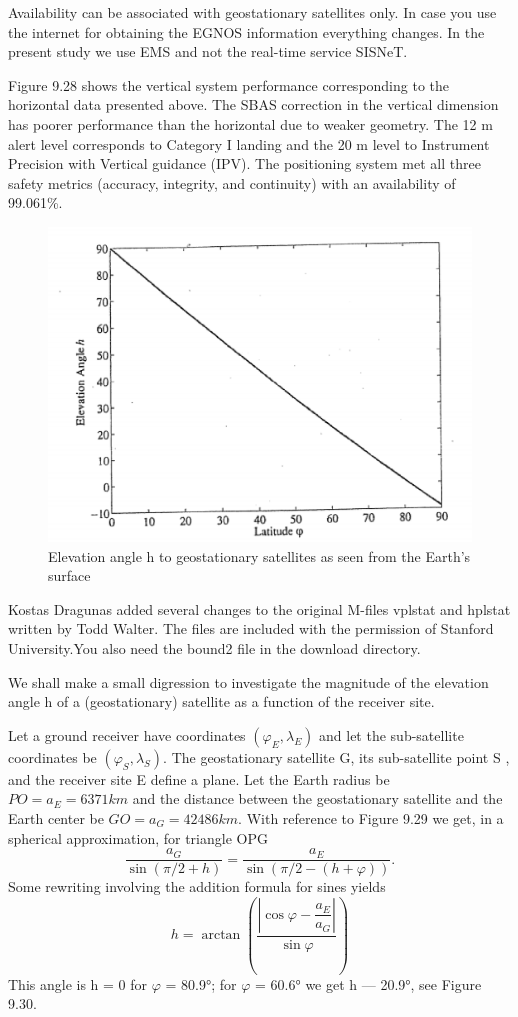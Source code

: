 		Availability can be associated with geostationary satellites only. In case you use the internet for obtaining the EGNOS information everything changes. In the present study we use EMS and not the real-time service SISNeT.
		
		
		Figure 9.28 shows the vertical system performance corresponding to the horizontal data presented above. The SBAS correction in the vertical dimension has poorer performance than the horizontal due to weaker geometry. The 12 m alert level corresponds to Category I landing and the 20 m level to Instrument Precision with Vertical guidance (IPV). The positioning system met all three safety metrics (accuracy, integrity, and continuity) with an
		availability of 99.061\%.
		\begin{figure}[h]
			\centering
			\includegraphics[width=0.7\linewidth]{TeX_files/Part03/chapter09/image/9-30}
			\caption{Elevation angle h to geostationary satellites as seen from the Earth’s surface}
			\label{fig:9-30}
		\end{figure}
		
		Kostas Dragunas added several changes to the original M-files vplstat and hplstat written by Todd Walter. The files are included with the permission of Stanford University.You also need the bound2 file in the download directory.
		
		We shall make a small digression to investigate the magnitude of the elevation angle h of a (geostationary) satellite as a function of the receiver site.
		
		Let a ground receiver have coordinates $(\varphi_E,\lambda_E)$ and let the sub-satellite coordinates be $(\varphi_S,\lambda_S)$. The geostationary satellite G, its sub-satellite point S , and the receiver site E define a plane. Let the Earth radius be $PO = a_E = 6371km$ and the distance between the geostationary satellite and the Earth center be $GO = a_G = 42486km$. With reference to Figure 9.29 we get, in a spherical approximation, for triangle OPG
		\begin{equation}\label{9.76}
			\dfrac{a_G}{\sin(\pi/2+h)} = \dfrac{a_E}{\sin(\pi/2-(h+\varphi))}.
		\end{equation}
		Some rewriting involving the addition formula for sines yields
		\begin{equation}\label{9.77}
			h = \arctan(\dfrac{\left| \cos \varphi - \dfrac{a_E}{a_G}\right| }{\sin \varphi})
		\end{equation}
		This angle is h = 0 for $\varphi$ = 80.9°; for $\varphi$ = 60.6° we get h — 20.9°, see Figure 9.30.
		
